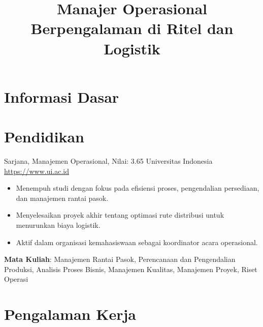 \documentclass[a4paper, serif, 10pt]{moderncv}
\title{Manajer Operasional Berpengalaman di Ritel dan Logistik}
\begin{document}
\maketitle

\section{Informasi Dasar}

\section{Pendidikan}

        {Sarjana, Manajemen Operasional, Nilai: 3.65}
        {Universitas Indonesia}
        {\url{https://www.ui.ac.id}}
        {}
        {\begin{itemize}
\item Menempuh studi dengan fokus pada efisiensi proses, pengendalian persediaan, dan manajemen rantai pasok.
\item Menyelesaikan proyek akhir tentang optimasi rute distribusi untuk menurunkan biaya logistik.
\item Aktif dalam organisasi kemahasiswaan sebagai koordinator acara operasional.
\end{itemize}
\textbf{Mata Kuliah}: Manajemen Rantai Pasok, Perencanaan dan Pengendalian Produksi, Analisis Proses Bisnis, Manajemen Kualitas, Manajemen Proyek, Riset Operasi}
\section{Pengalaman Kerja}
\end{document}
